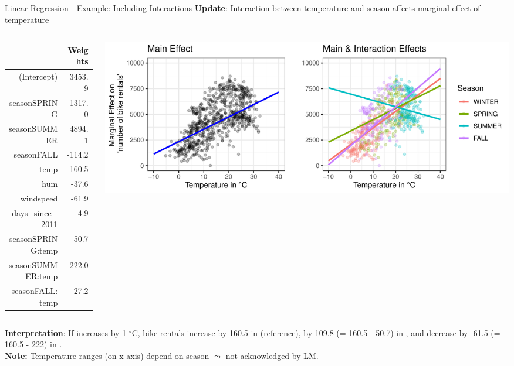 \documentclass[11pt,compress,t,notes=noshow, aspectratio=169, xcolor=table]{beamer}
\begin{document}
\begin{frame}{Linear Regression - Example: Including Interactions}
\textbf{Update}: Interaction between temperature and season affects marginal effect of temperature%
\begin{columns}[T]
\begin{column}{0.25\textwidth}
\begin{tiny}
\begin{table}[ht]
\centering
\begin{tabular}{rr}
  \hline
 & Weights \\ 
  \hline
(Intercept) & 3453.9 \\ 
  seasonSPRING & 1317.0 \\ 
  seasonSUMMER & 4894.1 \\ 
  seasonFALL & -114.2 \\ 
  temp & 160.5 \\ 
  hum & -37.6 \\ 
  windspeed & -61.9 \\ 
  days\_since\_2011 & 4.9 \\
  \hline
  seasonSPRING:temp & -50.7 \\ 
  seasonSUMMER:temp & -222.0 \\ 
  seasonFALL:temp & 27.2 \\ 
   \hline
\end{tabular}
\end{table}
\end{tiny}
\end{column}
\begin{column}{0.7\textwidth}
\includegraphics[width = \textwidth]{figure/lm_main_vs_interaction_effects.pdf}
\end{column}
\end{columns}
\vfill
\pause
\textbf{Interpretation}: If  increases by 1 $^{\circ}$C, bike rentals increase by 160.5 in  (reference), by 109.8 (= 160.5 - 50.7) in , and decrease by -61.5 (= 160.5 - 222) in .\\\vspace*{0.2cm}
\textbf{Note:} Temperature ranges (on x-axis) depend on season $\leadsto$ not acknowledged by LM.
\end{frame}
\end{document}
